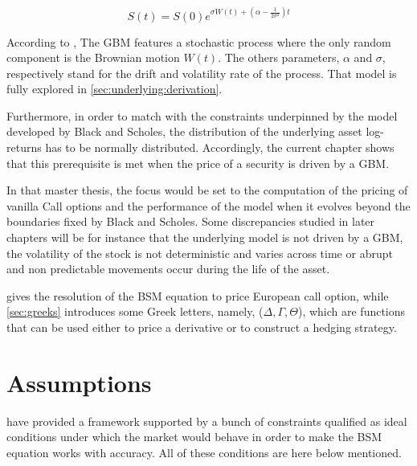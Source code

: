 \documentclass[12pt]{report}
\newcommand{\Bm}{W\left(t\right)}
\newcommand{\St}{S\left(t\right)}
\newcommand{\Si}{S\left(0\right)}
\newcommand{\Scontinuous}{\St = \Si e^{\sigma\Bm + \left(\alpha - \frac{1}{2 \sigma^2}\right)t}}
\begin{document}
\begin{center}
  \begin{equation}
    \Scontinuous
    \label{eq:underlying:geometric:closed}
  \end{equation}
\end{center}
According to \citet{shreve}, The  GBM features a stochastic process where the only random component is the Brownian motion $\Bm$. 
The others parameters, $\alpha$ and $\sigma$,  respectively stand for the drift and volatility rate of the process.
That model is fully explored in \cref{sec:underlying:derivation}.


 
Furthermore, in order to match with the constraints underpinned by the model developed by Black and Scholes, the distribution of the underlying asset log-returns has to be normally distributed.
Accordingly, the current chapter shows that this prerequisite is met when the price of a security is driven by a GBM.









In that master thesis, the focus would be set to the computation of the pricing of vanilla Call options and the performance of the model when it evolves beyond the boundaries fixed by Black and Scholes. 
Some discrepancies studied in later chapters will be for instance that the underlying model is not driven by a GBM, the volatility of the stock is not deterministic and varies across time or abrupt and non predictable movements occur during the life of the asset.



 gives the resolution of the BSM equation to price European call option, while \cref{sec:greeks} introduces some Greek letters, namely, ($\Delta, \Gamma, \Theta$), which are functions that can be used either to price a derivative or to construct a hedging strategy.



\section{Assumptions}
\label{sec:bsm:assumptions}

\citet{bs} have provided a framework supported by a bunch of constraints qualified as ideal conditions under which the market would behave in order to make the BSM equation works with accuracy. All of these conditions are here below mentioned.
\end{document}
